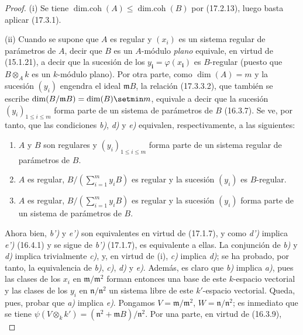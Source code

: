 \begin{proof}
\textnormal{(i)} Se tiene
$\operatorname{dim.coh}(A)\leq\operatorname{dim.coh}(B)$ por (17.2.13), luego
basta aplicar (17.3.1).

\textnormal{(ii)} Cuando se supone que $A$ es regular y $(x_i)$ es un sistema
regular de parámetros de $A$, decir que $B$ es un $A$-módulo \emph{plano}
equivale, en virtud de (15.1.21), a decir que la sucesión de los
$y_{\boldsymbol i}=\varphi(x_{\boldsymbol i})$ es $B$-regular (puesto que $B\otimes_A k$ es un
$k$-módulo plano). Por otra parte, como $\dim(A)=m$ y la sucesión $(y_i)$
engendra el ideal $\mathfrak{m}B$, la relación (17.3.3.2), que también se
escribe $\dim(B/\mathfrak{m}B)=\dim(B)\setmin m$, equivale a decir que la sucesión
$(y_i)_{1\leq i\leq m}$ forma parte de un sistema de parámetros de $B$
(16.3.7). Se ve, por tanto, que las condiciones \emph{b)}, \emph{d)} y \emph{e)} equivalen,
respectivamente, a las siguientes:
\begin{enumerate}
  \item[\textit{b')}] $A$ y $B$ son regulares y $(y_i)_{1\leq i\leq m}$ forma
  parte de un sistema regular de parámetros de $B$.
  \item[\textit{d')}] $A$ es regular,
  $B/(\sum_{i=1}^m y_iB)$ es regular y la sucesión $(y_i)$ es
  $B$-regular.
  \item[\textit{e')}] $A$ es regular,
  $B/(\sum_{i=1}^m y_iB)$ es regular y la sucesión $(y_i)$ forma parte de un
  sistema de parámetros de $B$.
\end{enumerate}
Ahora bien, \emph{b')} y \emph{e')} son equivalentes en virtud de (17.1.7), y como \emph{d')}
implica \emph{e')} (16.4.1) y se sigue de \emph{b')} (17.1.7), es equivalente a ellas.
La conjunción
de \emph{b)} y \emph{d)} implica trivialmente \emph{c)}, y, en virtud de (i), \emph{c)} implica \emph{d)}; se ha
probado, por tanto, la equivalencia de \emph{b)}, \emph{c)}, \emph{d)} y \emph{e)}. Además, es claro que
\emph{b)} implica \emph{a)}, pues las clases de los $x_i$ en
$\mathfrak{m}/\mathfrak{m}^2$ forman entonces una base de este $k$-espacio
vectorial y las clases de los $y_i$ en $\mathfrak{n}/\mathfrak{n}^2$ un
sistema libre de este $k'$-espacio vectorial. Queda, pues, probar que \emph{a)}
implica \emph{e)}. Pongamos $V=\mathfrak{m}/\mathfrak{m}^2$,
$W=\mathfrak{n}/\mathfrak{n}^2$; es inmediato que se tiene
$\psi(V\otimes_k k')=(\mathfrak{n}^2+\mathfrak{m}B)/\mathfrak{n}^2$. Por una
parte, en virtud de (16.3.9),
\begin{equation}

\end{equation}
\end{proof}
